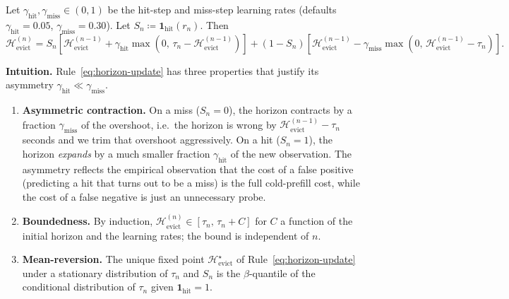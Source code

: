 \begin{definition}
\label{def:horizon-update}
Let $\gamma_{\text{hit}}, \gamma_{\text{miss}} \in (0, 1)$ be the
hit-step and miss-step learning rates (defaults
$\gamma_{\text{hit}} = 0.05$, $\gamma_{\text{miss}} = 0.30$).
Let $S_n \coloneqq \mathbf{1}_{\text{hit}}(r_n)$. Then
\begin{equation}
  \mathcal{H}_{\text{evict}}^{(n)}
  = S_n \left[
      \mathcal{H}_{\text{evict}}^{(n-1)}
      + \gamma_{\text{hit}} \max(0,\, \tau_n - \mathcal{H}_{\text{evict}}^{(n-1)})
    \right]
  + (1 - S_n) \left[
      \mathcal{H}_{\text{evict}}^{(n-1)}
      - \gamma_{\text{miss}} \max(0,\, \mathcal{H}_{\text{evict}}^{(n-1)} - \tau_n)
    \right].
  \label{eq:horizon-update}
\end{equation}
\end{definition}

\noindent
\textbf{Intuition.} Rule~\eqref{eq:horizon-update} has three
properties that justify its asymmetry $\gamma_{\text{hit}} \ll
\gamma_{\text{miss}}$.

\begin{enumerate}
  \item \textbf{Asymmetric contraction.} On a miss ($S_n = 0$), the
        horizon contracts by a fraction $\gamma_{\text{miss}}$ of the
        overshoot, i.e.\ the horizon is wrong by
        $\mathcal{H}_{\text{evict}}^{(n-1)} - \tau_n$ seconds and we
        trim that overshoot aggressively. On a hit ($S_n = 1$), the
        horizon \emph{expands} by a much smaller fraction
        $\gamma_{\text{hit}}$ of the new observation. The asymmetry
        reflects the empirical observation that the cost of a false
        positive (predicting a hit that turns out to be a miss) is
        the full cold-prefill cost, while the cost of a false
        negative is just an unnecessary probe.
  \item \textbf{Boundedness.} By induction,
        $\mathcal{H}_{\text{evict}}^{(n)} \in [\tau_n,\, \tau_n + C]$
        for $C$ a function of the initial horizon and the learning
        rates; the bound is independent of $n$.
  \item \textbf{Mean-reversion.} The unique fixed point
        $\mathcal{H}_{\text{evict}}^{\star}$ of
        Rule~\eqref{eq:horizon-update} under a stationary
        distribution of $\tau_n$ and $S_n$ is the $\beta$-quantile
        of the conditional distribution of $\tau_n$ given
        $\mathbf{1}_{\text{hit}} = 1$.
\end{enumerate}

